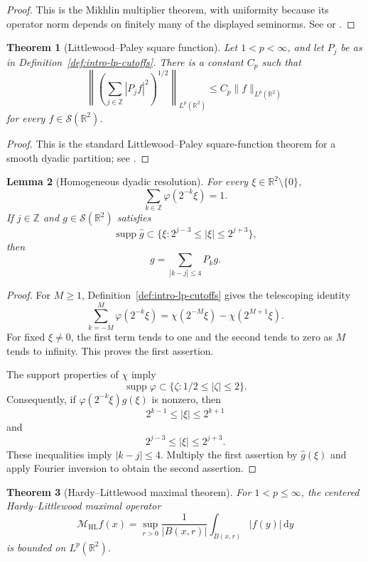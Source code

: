 \documentclass[11pt]{article}
\numberwithin{equation}{section}
\newtheorem{theorem}{Theorem}[section]
\newtheorem{lemma}[theorem]{Lemma}
\theoremstyle{definition}
\theoremstyle{remark}
\newcommand{\R}{\mathbb R}
\newcommand{\Z}{\mathbb Z}
\newcommand{\Sch}{\mathcal S}
\newcommand{\MHL}{\mathcal M_{\mathrm{HL}}}
\newcommand{\supp}{\operatorname{supp}}
\newcommand{\dd}{\,\mathrm d}
\begin{document}
\begin{proof}
This is the Mikhlin multiplier theorem, with uniformity because its operator norm depends on finitely many of the displayed seminorms.  See \cite[Chapter~IV, Section~3]{Stein1970} or \cite[Chapter~5]{Grafakos2014}.
\end{proof}

\begin{theorem}[Littlewood--Paley square function]\label{thm:littlewood-paley}
Let $1<p<\infty$, and let $P_j$ be as in Definition~\ref{def:intro-lp-cutoffs}.  There is a constant $C_p$ such that
\[
\left\|\left(\sum_{j\in\Z}|P_jf|^2\right)^{1/2}\right\|_{L^p(\R^2)}
\le C_p\|f\|_{L^p(\R^2)}
\]
for every $f\in\Sch(\R^2)$.
\end{theorem}

\begin{proof}
This is the standard Littlewood--Paley square-function theorem for a smooth dyadic partition; see \cite[Chapter~6]{Grafakos2014}.
\end{proof}

\begin{lemma}[Homogeneous dyadic resolution]\label{lem:homogeneous-dyadic-resolution}
For every $\xi\in\R^2\setminus\{0\}$,
\[
\sum_{k\in\Z}\varphi(2^{-k}\xi)=1.
\]
If $j\in\Z$ and $g\in\Sch(\R^2)$ satisfies
\[
\supp\widehat g\subset\{\xi:2^{j-3}\le|\xi|\le2^{j+3}\},
\]
then
\[
g=\sum_{|k-j|\le4}P_kg.
\]
\end{lemma}

\begin{proof}
For $M\ge1$, Definition~\ref{def:intro-lp-cutoffs} gives the telescoping identity
\[
\sum_{k=-M}^{M}\varphi(2^{-k}\xi)
=\chi(2^{-M}\xi)-\chi(2^{M+1}\xi).
\]
For fixed $\xi\ne0$, the first term tends to one and the second tends to zero as $M$ tends to infinity.  This proves the first assertion.

The support properties of $\chi$ imply
\[
\supp\varphi\subset\{\zeta:1/2\le|\zeta|\le2\}.
\]
Consequently, if $\varphi(2^{-k}\xi)\widehat g(\xi)$ is nonzero, then
\[
2^{k-1}\le|\xi|\le2^{k+1}
\]
and
\[
2^{j-3}\le|\xi|\le2^{j+3}.
\]
These inequalities imply $|k-j|\le4$.  Multiply the first assertion by $\widehat g(\xi)$ and apply Fourier inversion to obtain the second assertion.
\end{proof}

\begin{theorem}[Hardy--Littlewood maximal theorem]\label{thm:hardy-littlewood}
For $1<p\le\infty$, the centered Hardy--Littlewood maximal operator
\[
\MHL f(x)=\sup_{r>0}\frac1{|B(x,r)|}\int_{B(x,r)}|f(y)|\dd y
\]
is bounded on $L^p(\R^2)$.
\end{theorem}
\end{document}
